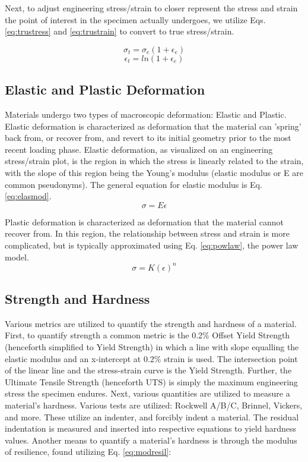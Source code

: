 \documentclass{article}
\begin{document}
Next, to adjust engineering stress/strain to closer represent the stress and strain the point of interest in the specimen actually undergoes, we utilize Eqs. \ref{eq:trustress} and \ref{eq:trustrain} to convert to true stress/strain.

\begin{equation}
    \sigma_t = \sigma_e \left(1+ \epsilon_e \right)
    \label{eq:trustress}
\end{equation}
\begin{equation}
    \epsilon_t = ln\left(1+\epsilon_e\right)
    \label{eq:trustrain}
\end{equation}

\subsection{Elastic and Plastic Deformation}
Materials undergo two types of macroscopic deformation: Elastic and Plastic. Elastic deformation is characterized as deformation that the material can 'spring' back from, or recover from, and revert to its initial geometry prior to the most recent loading phase. Elastic deformation, as visualized on an engineering stress/strain plot, is the region in which the stress is linearly related to the strain, with the slope of this region being the Young's modulus (elastic modulus or E are common pseudonyms). The general equation for elastic modulus is Eq. \ref{eq:elasmod}. 
\begin{equation}
    \sigma = E\epsilon
    \label{eq:elasmod}
\end{equation}

Plastic deformation is characterized as deformation that the material cannot recover from. In this region, the relationship between stress and strain is more complicated, but is typically approximated using Eq. \ref{eq:powlaw}, the power law model.
\begin{equation}
    \sigma = K \left( \epsilon\right)^n
    \label{eq:powlaw}
\end{equation}

\subsection{Strength and Hardness}
Various metrics are utilized to quantify the strength and hardness of a material. First, to quantify strength a common metric is the 0.2\% Offset Yield Strength (henceforth simplified to Yield Strength) in which a line with slope equalling the elastic modulus and an x-intercept at 0.2\% strain is used. The intersection point of the linear line and the stress-strain curve is the Yield Strength. Further, the Ultimate Tensile Strength (henceforth UTS) is simply the maximum engineering stress the specimen endures. Next, various quantities are utilized to measure a material's hardness. Various tests are utilized: Rockwell A/B/C, Brinnel, Vickers, and more. These utilize an indenter, and forcibly indent a material. The residual indentation is measured and inserted into respective equations to yield hardness values. Another means to quantify a material's hardness is through the modulus of resilience, found utilizing Eq. \ref{eq:modresil}:
\end{document}
